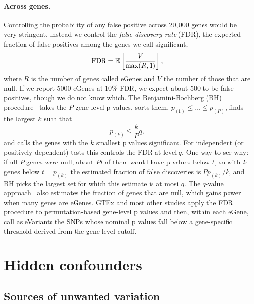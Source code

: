 \paragraph{Across genes.} Controlling the probability of any false positive across $20{,}000$ genes would be very stringent. Instead we control the \emph{false discovery rate} (FDR), the expected fraction of false positives among the genes we call significant,
\begin{equation}
  \text{FDR} = \mathbb{E}\left[\frac{V}{\max(R,1)}\right],
\end{equation}
where $R$ is the number of genes called eGenes and $V$ the number of those that are null. If we report 5000 eGenes at 10\% FDR, we expect about 500 to be false positives, though we do not know which. The Benjamini-Hochberg (BH) procedure~\citep{benjamini1995} takes the $P$ gene-level p values, sorts them, $p_{(1)}\leq\dots\leq p_{(P)}$, finds the largest $k$ such that
\begin{equation}
  p_{(k)} \leq \frac{k}{P}q,
\end{equation}
and calls the genes with the $k$ smallest p values significant. For independent (or positively dependent) tests this controls the FDR at level $q$. One way to see why: if all $P$ genes were null, about $Pt$ of them would have p values below $t$, so with $k$ genes below $t=p_{(k)}$ the estimated fraction of false discoveries is $Pp_{(k)}/k$, and BH picks the largest set for which this estimate is at most $q$. The $q$-value approach~\citep{storey2003} also estimates the fraction of genes that are null, which gains power when many genes are eGenes. GTEx and most other studies apply the FDR procedure to permutation-based gene-level p values and then, within each eGene, call as eVariants the SNPs whose nominal p values fall below a gene-specific threshold derived from the gene-level cutoff.

\section{Hidden confounders}
\label{sec:hidden}

\subsection{Sources of unwanted variation}

